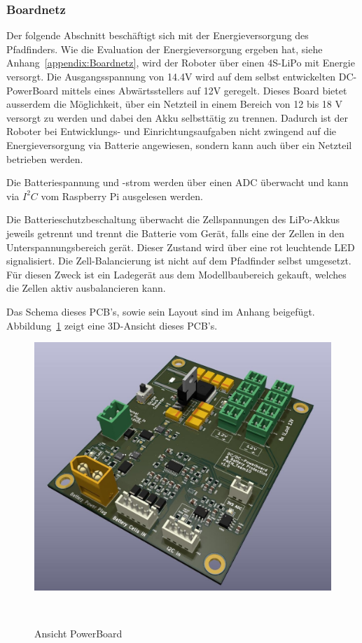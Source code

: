 \documentclass[main.tex]{subfiles} %
\begin{document}

\subsubsection{Boardnetz}

Der folgende Abschnitt beschäftigt sich mit der Energieversorgung des
Pfadfinders. Wie die Evaluation der Energieversorgung ergeben hat, siehe
Anhang~\ref{appendix:Boardnetz}, wird der Roboter über einen 4S-LiPo mit
Energie versorgt. Die Ausgangsspannung von 14.4V wird auf dem selbst
entwickelten DC-PowerBoard mittels eines Abwärtsstellers auf 12V geregelt.
Dieses Board bietet ausserdem die Möglichkeit, über ein Netzteil in einem
Bereich von 12 bis 18 V versorgt zu werden und dabei den Akku selbsttätig zu
trennen. Dadurch ist der Roboter bei Entwicklungs- und Einrichtungsaufgaben
nicht zwingend auf die Energieversorgung via Batterie angewiesen, sondern kann
auch über ein Netzteil betrieben werden.

Die Batteriespannung und -strom werden über einen ADC überwacht und kann via
$I^2C$ vom Raspberry Pi ausgelesen werden.

Die Batterieschutzbeschaltung überwacht die Zellspannungen des LiPo-Akkus
jeweils getrennt und trennt die Batterie vom Gerät, falls eine der Zellen in
den Unterspannungsbereich gerät. Dieser Zustand wird über eine rot leuchtende
LED signalisiert. Die Zell-Balancierung ist nicht auf dem Pfadfinder selbst
umgesetzt. Für diesen Zweck ist ein Ladegerät aus dem Modellbaubereich gekauft,
welches die Zellen aktiv ausbalancieren kann.

Das Schema dieses PCB's, sowie sein Layout sind im Anhang beigefügt.
Abbildung~\ref{PowerBoard_Ansicht} zeigt eine 3D-Ansicht dieses PCB's.

\begin{figure}[H]
    \centering
    \includegraphics[width = 0.75\linewidth]{fig_Boardnetz/PowerDistributionBoard.jpg}
    \caption{Ansicht PowerBoard}~\label{PowerBoard_Ansicht}
\end{figure}
\end{document}
